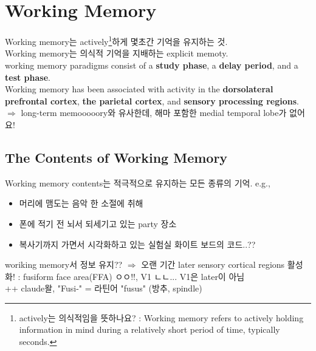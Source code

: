 \documentclass[../note.tex]{subfiles}
\begin{document}
\setcounter{chapter}{5}
\chapter{Working Memory}
Working memory는 actively\footnote{actively는 의식적임을 뜻하나요? : Working memory refers to actively holding information in mind during
a relatively short period of time, typically seconds.}하게 몇초간 기억을 유지하는 것.\\
Working memory는 의식적 기억을 지배하는 explicit memoty.\\

working memory paradigms consist of a \textbf{study phase}, a \textbf{delay period}, and a \textbf{test phase}.\\

Working memory has been associated with activity
in the \textbf{dorsolateral prefrontal cortex}, \textbf{the parietal cortex}, and \textbf{sensory
processing regions}.\\
$\Longrightarrow$ long-term memooooory와 유사한데, 해마 포함한 medial temporal lobe가 없어요!

\section{The Contents of Working Memory}
Working memory contents는 적극적으로 유지하는 모든 종류의 기억. e.g.,
\begin{itemize}
  \item 머리에 맴도는 음악 한 소절에 취해
  \item 폰에 적기 전 뇌서 되세기고 있는 party 장소
  \item 복사기까지 가면서 시각화하고 있는 실험실 화이트 보드의 코드..??
\end{itemize}

woriking memory서 정보 유지?? $\Longrightarrow$ 오랜 기간 later sensory cortical regions 활성화!
: fusiform face area(FFA) ㅇㅇ!!, V1 ㄴㄴ... V1은 later이 아님\\

++ claude왈, "Fusi-" = 라틴어 "fusus" (방추, spindle)\\
\end{document}
